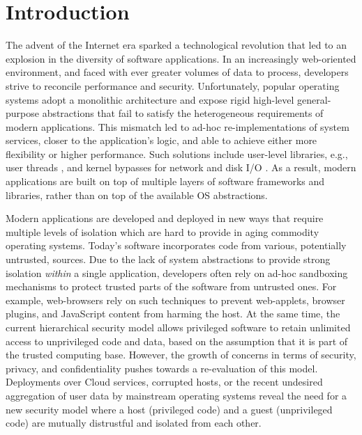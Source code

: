 \section{Introduction}

The advent of the Internet era sparked a technological revolution that led to an explosion in the diversity of software applications.
In an increasingly web-oriented environment, and faced with ever greater volumes of data to process, developers strive to reconcile performance and security.
Unfortunately, popular operating systems adopt a monolithic architecture and expose rigid high-level general-purpose abstractions that fail to satisfy the heterogeneous requirements of modern applications.
This mismatch led to ad-hoc re-implementations of system services, closer to the application's logic, and able to achieve either more flexibility or higher performance.
Such solutions include user-level libraries, e.g., user threads \cite{golang}, and kernel bypasses for network and disk I/O \cite{DBLP:conf/nsdi/NanavatiWW17,intel2014data,intel2016storage,BelayPKGKB14}.
As a result, modern applications are built on top of multiple layers of software frameworks and libraries, rather than on top of the available OS abstractions.

Modern applications are developed and deployed in new ways that require multiple levels of isolation which are hard to provide in aging commodity operating systems.
Today's software incorporates code from various, potentially untrusted, sources.
Due to the lack of system abstractions to provide strong isolation \emph{within} a single application, developers often rely on ad-hoc sandboxing mechanisms to protect trusted parts of the software from untrusted ones.
For example, web-browsers rely on such techniques to prevent web-applets, browser plugins, and JavaScript content from harming the host.
At the same time, the current hierarchical security model allows privileged software to retain unlimited access to unprivileged code and data, based on the assumption that it is part of the trusted computing base.
However, the growth of concerns in terms of security, privacy, and confidentiality pushes towards a re-evaluation of this model.
Deployments over Cloud services, corrupted hosts, or the recent undesired aggregation of user data by mainstream operating systems \cite{microsoftspy} reveal the need for a new security model where a host (privileged code) and a guest (unprivileged code) are mutually distrustful and isolated from each other.

